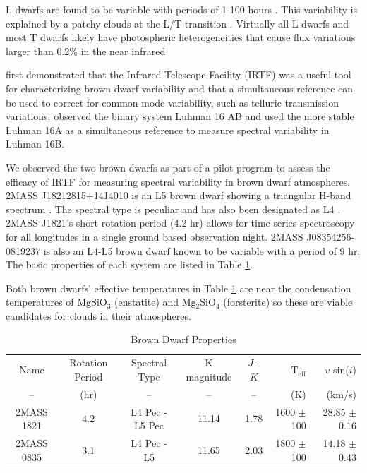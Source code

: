 \documentclass[twocolumn]{aastex6}
\begin{document}
L dwarfs are found to be variable with periods of 1-100 hours \citep{bailer-jones1999bdvar,bailer-jones1999varevo}.
This variability is explained by a patchy clouds at the L/T transition \citep{marley2010patchyc}.
Virtually all L dwarfs and most T dwarfs likely have photospheric heterogeneities that cause flux variations larger than 0.2\% in the near infrared \citep{metchev2015weatherII}

\citet{burgaser2014irtf} first demonstrated that the Infrared Telescope Facility (IRTF) was a useful tool for characterizing brown dwarf variability and that a simultaneous reference can be used to correct for common-mode variability, such as telluric transmission variations.
\citet{burgaser2014irtf} observed the binary system Luhman 16 AB and used the more stable Luhman 16A as a simultaneous reference to measure spectral variability in Luhman 16B.

We observed the two brown dwarfs as part of a pilot program to assess the efficacy of IRTF for measuring spectral variability in brown dwarf atmospheres.
2MASS J18212815+1414010 is an L5 brown dwarf showing a triangular H-band spectrum \citep{looper2008peculiarLdwarfs}.
The spectral type is peculiar and has also been designated as L4 \citep{gagne2015banyan7}.
2MASS J1821's short rotation period (4.2 hr) allows for time series spectroscopy for all longitudes in a single ground based observation night.
2MASS J08354256-0819237 \citep{cruz2003coolNeighbors} is also an L4-L5 brown dwarf known to be variable with a period of 9 hr.
The basic properties of each system are listed in Table \ref{tab:bdProp}.

Both brown dwarfs' effective temperatures in Table \ref{tab:bdProp} are near the condensation temperatures of MgSiO$_3$ (enstatite) and Mg$_2$SiO$_4$ (forsterite) \citep{marley2015rev} so these are viable candidates for clouds in their atmospheres.

\begin{table}
\begin{center}
\caption{Brown Dwarf Properties}\label{tab:bdProp}
\begin{tabular}{cccccrr}
Name & Rotation Period & Spectral Type & K magnitude  & $J$ - $K$ & T$_\mathrm{eff}$ &  $v$ sin($i$) \\
-- & (hr) & -- & -- & -- & (K) & (km/s) \\
\hline \hline
2MASS 1821 & 4.2\tablenotemark{a} & L4 Pec\tablenotemark{b} - L5 Pec\tablenotemark{c} & 11.14 & 1.78 & 1600 $\pm$ 100\tablenotemark{b} & 28.85 $\pm$ 0.16\tablenotemark{d}\\
2MASS 0835 & 3.1\tablenotemark{e} & L4 Pec\tablenotemark{b} - L5\tablenotemark{f} & 11.65 & 2.03 & 1800 $\pm$ 100\tablenotemark{b} & 14.18 $\pm$ 0.43\tablenotemark{d} \\
\end{tabular}
\end{center}
\end{table}
\end{document}
